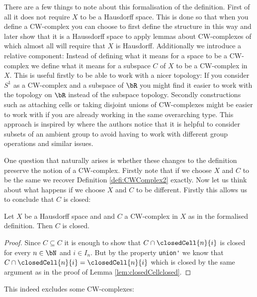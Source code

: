 There are a few things to note about this formalisation of the definition. 
First of all it does not require $X$ to be a Hausdorff space. 
This is done so that when you define a CW-complex you can choose to first define the structure in this way and later show that it is a Haussdorff space to apply lemmas about CW-complexes of which almost all will require that $X$ is Hausdorff. 
Additionally we introduce a relative component: 
Instead of defining what it means for a space to be a CW-complex we define what it means for a subspace $C$ of $X$ to be a CW-complex in $X$.
This is useful firstly to be able to work with a nicer topology: 
If you consider $S^1$ as a CW-complex and a subspace of $\bR$ you might find it easier to work with the topology on $\bR$ instead of the subspace topology. 
Secondly constructions such as attaching cells or taking disjoint unions of CW-complexes might be easier to work with if you are already working in the same overarching type.
This approach is inspired by \cite{Gonthier2013} where the authors notice that it is helpful to consider subsets of an ambient group to avoid having to work with different group operations and similar issues. 

One question that naturally arises is whether these changes to the definition preserve the notion of a CW-complex. 
Firstly note that if we choose $X$ and $C$ to be the same we recover Definition \ref{defi:CWComplex2} exactly. 
Now let us think about what happens if we choose $X$ and $C$ to be different. 
Firstly this allows us to conclude that $C$ is closed: 

\begin{lem} \label{lem:Cclosed}
  Let $X$ be a Hausdorff space and and $C$ a CW-complex in $X$ as in the formalised definition. 
  Then $C$ is closed.
\end{lem}
\begin{proof}
  Since $C \subseteq C$ it is enough to show that $C \cap \closedCell{n}{i}$ is closed for every $n \in \bN$ and $i \in I_n$. 
  But by the property \lstinline{union'} we know that $C \cap \closedCell{n}{i} = \closedCell{n}{i}$ which is closed by the same argument as in the proof of Lemma \ref{lem:closedCellclosed}.
\end{proof}

This indeed excludes some CW-complexes: 

